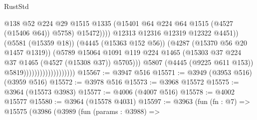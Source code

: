 \begin{lexlean}{RustStd}
\begin{coremodule}
                                                        @138
                                                        @52
                                                        @224
                                                        @29
                                                        @1515
                                                        @1335
                                                        (@15401
                                                          @64
                                                          @224
                                                          @64
                                                          @1515
                                                          (@4527 (@15406 @64))
                                                          @5758)
                                                        @15472))))
                                                @12313
                                                @12316
                                                @12319
                                                @12322
                                                @4451))
                                            (@5581 (@15359 @18))
                                            (@4445 (@15363 @152 @56))
                                            (@4287 (@15370 @56 @20 @1457 @1319))
                                            (@5789
                                              @15064
                                              @1091
                                              @119
                                              @224
                                              @1465
                                              (@15303
                                                @37
                                                @224
                                                @37
                                                @1465
                                                (@4527 (@15308 @37))
                                                @5705)))
                                          @5807
                                          (@4445 (@9225 @611 @153))
                                          @5819)))))))))))))))))))
@15567 := @3947 @516
@15571 := @3949 (@3953 @516) (@3959 @516)
@15572 := @3978 @516
@15573 := @3968 @15572
@15575 := @3964 (@15573 @3983)
@15577 := @4006 (@4007 @516)
@15578 := @4002 @15577
@15580 := @3964 (@15578 @4031)
@15597 := @3963
    (fun (fn : @7) =>
    @15575
      (@3986
        (@3989
          (fun (params : @3988) =>

\end{coremodule}
\end{lexlean}

